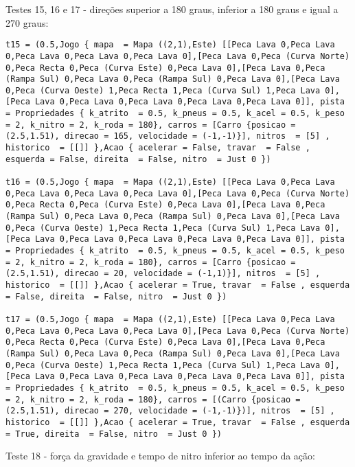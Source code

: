 \documentclass[a4paper]{report}
\begin{document}
Testes 15, 16 e 17 - direções superior a 180 graus, inferior a 180 graus e igual a 270 graus:

\begin{lstlisting}
t15 = (0.5,Jogo { mapa  = Mapa ((2,1),Este) [[Peca Lava 0,Peca Lava 0,Peca Lava 0,Peca Lava 0,Peca Lava 0],[Peca Lava 0,Peca (Curva Norte) 0,Peca Recta 0,Peca (Curva Este) 0,Peca Lava 0],[Peca Lava 0,Peca (Rampa Sul) 0,Peca Lava 0,Peca (Rampa Sul) 0,Peca Lava 0],[Peca Lava 0,Peca (Curva Oeste) 1,Peca Recta 1,Peca (Curva Sul) 1,Peca Lava 0],[Peca Lava 0,Peca Lava 0,Peca Lava 0,Peca Lava 0,Peca Lava 0]], pista = Propriedades { k_atrito  = 0.5, k_pneus = 0.5, k_acel = 0.5, k_peso = 2, k_nitro = 2, k_roda = 180}, carros = [Carro {posicao = (2.5,1.51), direcao = 165, velocidade = (-1,-1)}], nitros  = [5] , historico  = [[]] },Acao { acelerar = False, travar  = False , esquerda = False, direita  = False, nitro  = Just 0 })

t16 = (0.5,Jogo { mapa  = Mapa ((2,1),Este) [[Peca Lava 0,Peca Lava 0,Peca Lava 0,Peca Lava 0,Peca Lava 0],[Peca Lava 0,Peca (Curva Norte) 0,Peca Recta 0,Peca (Curva Este) 0,Peca Lava 0],[Peca Lava 0,Peca (Rampa Sul) 0,Peca Lava 0,Peca (Rampa Sul) 0,Peca Lava 0],[Peca Lava 0,Peca (Curva Oeste) 1,Peca Recta 1,Peca (Curva Sul) 1,Peca Lava 0],[Peca Lava 0,Peca Lava 0,Peca Lava 0,Peca Lava 0,Peca Lava 0]], pista = Propriedades { k_atrito  = 0.5, k_pneus = 0.5, k_acel = 0.5, k_peso = 2, k_nitro = 2, k_roda = 180}, carros = [Carro {posicao = (2.5,1.51), direcao = 20, velocidade = (-1,1)}], nitros  = [5] , historico  = [[]] },Acao { acelerar = True, travar  = False , esquerda = False, direita  = False, nitro  = Just 0 })

t17 = (0.5,Jogo { mapa  = Mapa ((2,1),Este) [[Peca Lava 0,Peca Lava 0,Peca Lava 0,Peca Lava 0,Peca Lava 0],[Peca Lava 0,Peca (Curva Norte) 0,Peca Recta 0,Peca (Curva Este) 0,Peca Lava 0],[Peca Lava 0,Peca (Rampa Sul) 0,Peca Lava 0,Peca (Rampa Sul) 0,Peca Lava 0],[Peca Lava 0,Peca (Curva Oeste) 1,Peca Recta 1,Peca (Curva Sul) 1,Peca Lava 0],[Peca Lava 0,Peca Lava 0,Peca Lava 0,Peca Lava 0,Peca Lava 0]], pista = Propriedades { k_atrito  = 0.5, k_pneus = 0.5, k_acel = 0.5, k_peso = 2, k_nitro = 2, k_roda = 180}, carros = [(Carro {posicao = (2.5,1.51), direcao = 270, velocidade = (-1,-1)})], nitros  = [5] , historico  = [[]] },Acao { acelerar = True, travar  = False , esquerda = True, direita  = False, nitro  = Just 0 })
\end{lstlisting}

Teste 18 - força da gravidade e tempo de nitro inferior ao tempo da ação:
\end{document}
